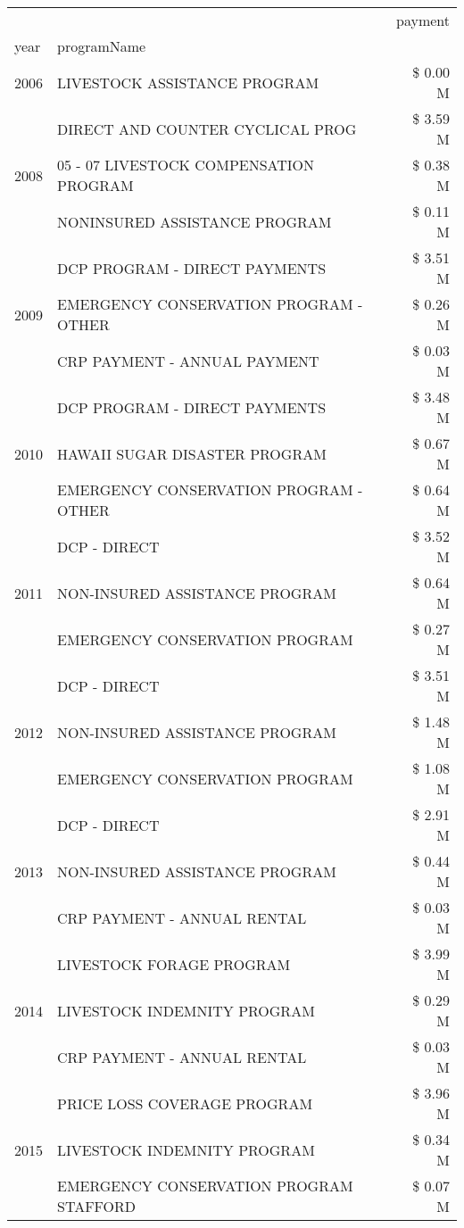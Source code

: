 \begin{tabular}{llr}
\toprule
 &  & payment \\
year & programName &  \\
\midrule
2006 & LIVESTOCK ASSISTANCE PROGRAM & \$ 0.00 M \\
\cline{1-3}
\multirow[t]{3}{*}{2008} & DIRECT AND COUNTER CYCLICAL PROG & \$ 3.59 M \\
 & 05 - 07 LIVESTOCK COMPENSATION PROGRAM & \$ 0.38 M \\
 & NONINSURED ASSISTANCE PROGRAM & \$ 0.11 M \\
\cline{1-3}
\multirow[t]{3}{*}{2009} & DCP PROGRAM - DIRECT PAYMENTS & \$ 3.51 M \\
 & EMERGENCY CONSERVATION PROGRAM - OTHER & \$ 0.26 M \\
 & CRP PAYMENT - ANNUAL PAYMENT & \$ 0.03 M \\
\cline{1-3}
\multirow[t]{3}{*}{2010} & DCP PROGRAM - DIRECT PAYMENTS & \$ 3.48 M \\
 & HAWAII SUGAR DISASTER PROGRAM & \$ 0.67 M \\
 & EMERGENCY CONSERVATION PROGRAM - OTHER & \$ 0.64 M \\
\cline{1-3}
\multirow[t]{3}{*}{2011} & DCP - DIRECT & \$ 3.52 M \\
 & NON-INSURED ASSISTANCE PROGRAM & \$ 0.64 M \\
 & EMERGENCY CONSERVATION PROGRAM & \$ 0.27 M \\
\cline{1-3}
\multirow[t]{3}{*}{2012} & DCP - DIRECT & \$ 3.51 M \\
 & NON-INSURED ASSISTANCE PROGRAM & \$ 1.48 M \\
 & EMERGENCY CONSERVATION PROGRAM & \$ 1.08 M \\
\cline{1-3}
\multirow[t]{3}{*}{2013} & DCP - DIRECT & \$ 2.91 M \\
 & NON-INSURED ASSISTANCE PROGRAM & \$ 0.44 M \\
 & CRP PAYMENT - ANNUAL RENTAL & \$ 0.03 M \\
\cline{1-3}
\multirow[t]{3}{*}{2014} & LIVESTOCK FORAGE PROGRAM & \$ 3.99 M \\
 & LIVESTOCK INDEMNITY PROGRAM & \$ 0.29 M \\
 & CRP PAYMENT - ANNUAL RENTAL & \$ 0.03 M \\
\cline{1-3}
\multirow[t]{3}{*}{2015} & PRICE LOSS COVERAGE PROGRAM & \$ 3.96 M \\
 & LIVESTOCK INDEMNITY PROGRAM & \$ 0.34 M \\
 & EMERGENCY CONSERVATION PROGRAM STAFFORD & \$ 0.07 M \\

\end{tabular}
